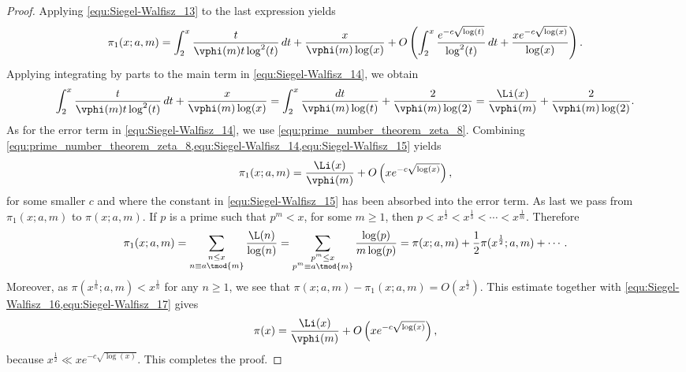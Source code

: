 \begin{proof}
      Applying \cref{equ:Siegel-Walfisz_13} to the last expression yields
      \begin{equation}\label{equ:Siegel-Walfisz_14}
        \pi_{1}(x;a,m) = \int_{2}^{x}\frac{t}{\vphi(m)t\log^{2}(t)}\,dt+\frac{x}{\vphi(m)\log(x)}+O\left(\int_{2}^{x}\frac{e^{-c\sqrt{\log(t)}}}{\log^{2}(t)}\,dt+\frac{xe^{-c\sqrt{\log(x)}}}{\log(x)}\right).
      \end{equation}
      Applying integrating by parts to the main term in \cref{equ:Siegel-Walfisz_14}, we obtain
      \begin{equation}\label{equ:Siegel-Walfisz_15}
        \int_{2}^{x}\frac{t}{\vphi(m)t\log^{2}(t)}\,dt+\frac{x}{\vphi(m)\log(x)} = \int_{2}^{x}\frac{dt}{\vphi(m)\log(t)}+\frac{2}{\vphi(m)\log(2)} = \frac{\Li(x)}{\vphi(m)}+\frac{2}{\vphi(m)\log(2)}.
      \end{equation}
      As for the error term in \cref{equ:Siegel-Walfisz_14}, we use \cref{equ:prime_number_theorem_zeta_8}. Combining \cref{equ:prime_number_theorem_zeta_8,equ:Siegel-Walfisz_14,equ:Siegel-Walfisz_15} yields
      \begin{equation}\label{equ:Siegel-Walfisz_16}
        \pi_{1}(x;a,m) = \frac{\Li(x)}{\vphi(m)}+O\left(xe^{-c\sqrt{\log(x)}}\right),
      \end{equation}
      for some smaller \(c\) and where the constant in \cref{equ:Siegel-Walfisz_15} has been absorbed into the error term. As last we pass from \(\pi_{1}(x;a,m)\) to \(\pi(x;a,m)\). If \(p\) is a prime such that \(p^{m} < x\), for some \(m \ge 1\), then \(p < x^{\frac{1}{2}} < x^{\frac{1}{3}} < \cdots < x^{\frac{1}{m}}\). Therefore
      \begin{equation}\label{equ:Siegel-Walfisz_17}
        \pi_{1}(x;a,m) = \sum_{\substack{n \le x \\ n \equiv a \tmod{m}}}\frac{\L(n)}{\log(n)} = \sum_{\substack{p^{m} \le x \\ p^{m} \equiv a \tmod{m}}}\frac{\log(p)}{m\log(p)} = \pi(x;a,m)+\frac{1}{2}\pi(x^{\frac{1}{2}};a,m)+\cdots.
      \end{equation}
      Moreover, as \(\pi(x^{\frac{1}{n}};a,m) < x^{\frac{1}{n}}\) for any \(n \ge 1\), we see that \(\pi(x;a,m)-\pi_{1}(x;a,m) = O(x^{\frac{1}{2}})\). This estimate together with \cref{equ:Siegel-Walfisz_16,equ:Siegel-Walfisz_17} gives
      \[
        \pi(x) = \frac{\Li(x)}{\vphi(m)}+O\left(xe^{-c\sqrt{\log(x)}}\right),
      \]
      because \(x^{\frac{1}{2}} \ll xe^{-c\sqrt{\log(x)}}\). This completes the proof.
    \end{proof}

